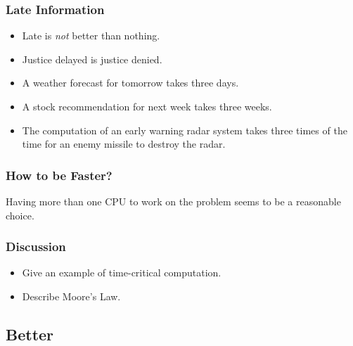 \documentclass{beamer}
\begin{document}
\begin{CJK}{UTF8}{bsmi}
\begin{frame}
\frametitle{Late Information}
\begin{itemize}
\item Late is {\em not} better than nothing.
\item Justice delayed is justice denied.
\item A weather forecast for tomorrow takes three days.
\item A stock recommendation for next week takes three weeks.
\item The computation of an early warning radar system takes three
  times of the time for an enemy missile to destroy the radar.
\end{itemize}
\end{frame}

\begin{frame}
\frametitle{How to be Faster?}
\Huge Having more than one CPU to work on the problem seems to be a
  reasonable choice.
\end{frame}

\begin{frame}
\frametitle{Discussion} \Large 
\begin{itemize}
\item Give an example of time-critical computation.
\item Describe Moore's Law.
\end{itemize}
\end{frame}



\subsection{Better}


\end{CJK}
\end{document}
